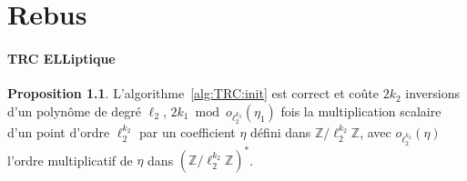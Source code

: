 \documentclass[10pt,a4paper]{book}
\theoremstyle{plain}
\theoremstyle{definition}
\theoremstyle{definition}
\theoremstyle{definition}
\newtheorem{prop}[thm]{Proposition}
\theoremstyle{definition}
\theoremstyle{remark}
\theoremstyle{remark}
\theoremstyle{definition}
\begin{document}
\chapter{Rebus}
\subsubsection{TRC ELLiptique}
\begin{prop}
L'algorithme~\ref{alg:TRC:init} est correct et coûte $2k_2$ inversions d'un polynôme de degré $\ell_2$, $2k_1 \bmod o_{\ell_2^{k_2}}(\eta_1)$ fois la multiplication scalaire d'un point d'ordre $\ell_2^{k_2}$ par un coefficient $\eta$ défini dans $\mathbb{Z}/\ell_2^{k_2} \mathbb{Z}$, avec $o_{\ell_2^{k_2}}(\eta)$ l'ordre multiplicatif de $\eta$ dans $(\mathbb{Z}/\ell_2^{k_2} \mathbb{Z})^*$.
\end{prop}
\end{document}

